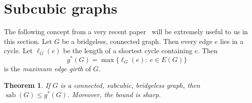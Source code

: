 \documentclass[10pt,a4paper]{amsart}
\newtheorem{theorem}{Theorem}[section]
\DeclareMathOperator{\sab}{\mathrm{sab}}
\begin{document}
\section{Subcubic graphs}
\label{sec:subcubic}

The following concept from a very recent paper~\cite{lin-2026} will be extremely useful to us in this section. Let $G$ be a bridgeless, connected graph. Then every edge $e$ lies in a cycle. Let $\ell_G(e)$ be the length of a shortest cycle containing $e$. Then 
$$g^\ast(G) = \max \{ \ell_G(e):\ e\in E(G)\}$$
is the {\em maximum edge girth} of $G$.

\begin{theorem}
\label{thm:subcubic}
If $G$ is a connected, subcubic, bridgeless graph, then $\sab(G) \le g^\ast(G)$. Moreover, the bound is sharp.
\end{theorem}
\end{document}
